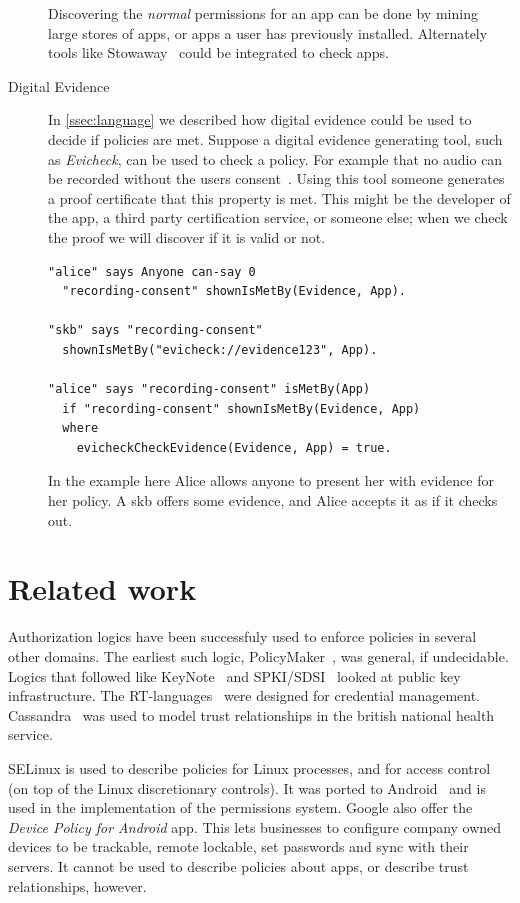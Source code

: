 \documentclass[]{scrartcl}
\begin{document}
\begin{description}
    Discovering the \emph{normal} permissions for an app can be done by mining large stores of apps, or apps a user has previously installed.
    Alternately tools like Stowaway~\citep{Felt:2011kj} could be integrated to check apps.

  \item[Digital Evidence]
    In \autoref{ssec:language} we described how digital evidence could be used to decide if policies are met.
    Suppose a digital evidence generating tool, such as \emph{Evicheck}, can be used to check a policy.
    For example that no audio can be recorded without the users consent~\citep{Seghir:2014uq}.
    Using this tool someone generates a proof certificate that this property is met.
    This might be the developer of the app, a third party certification service, or someone else;
      when we check the proof we will discover if it is valid or not.
    \begin{lstlisting}
"alice" says Anyone can-say 0
  "recording-consent" shownIsMetBy(Evidence, App).

"skb" says "recording-consent"
  shownIsMetBy("evicheck://evidence123", App).

"alice" says "recording-consent" isMetBy(App)
  if "recording-consent" shownIsMetBy(Evidence, App)
  where
    evicheckCheckEvidence(Evidence, App) = true.
    \end{lstlisting}
    In the example here Alice allows anyone to present her with evidence for her policy.
    A \ac{skb} offers some evidence, and Alice accepts it as if it checks out.
\end{description}

\section{Related work}

Authorization logics have been successfuly used to enforce policies in several other domains.
The earliest such logic, PolicyMaker~\cite{Blaze:dj}, was general, if undecidable.
Logics that followed like KeyNote~\citep{Blaze:1999fa} and SPKI/SDSI~\citep{Ellison:1999ui} looked at public key infrastructure.
The RT-languages~\citep{Li:2002if,Li:2003ix,Li:2003to} were designed for credential management.
Cassandra~\citep{Becker:2004fi} was used to model trust relationships in the british national health service.

SELinux is used to describe policies for Linux processes, and for access control (on top of the Linux discretionary controls).
It was ported to Android~\citep{Smalley:2013vl} and is used in the implementation of the permissions system.
Google also offer the \emph{Device Policy for Android} app.
This lets businesses to configure company owned devices to be trackable, remote lockable, set passwords and sync with their servers.
It cannot be used to describe policies about apps, or describe trust relationships, however.
\end{document}
